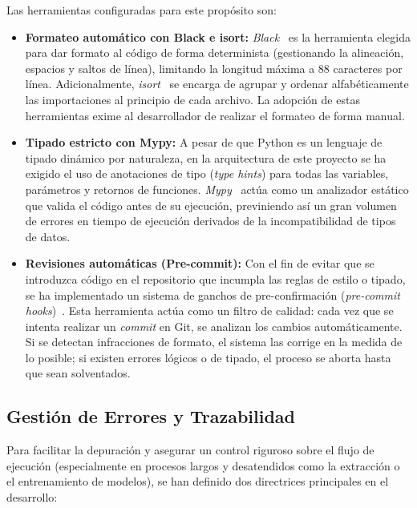 Las herramientas configuradas para este propósito son:
\begin{itemize}
    \item \textbf{Formateo automático con Black e isort:} \textit{Black}~\cite{BlackDocs} es la herramienta elegida para dar formato al código de forma determinista (gestionando la alineación, espacios y saltos de línea), limitando la longitud máxima a 88 caracteres por línea. Adicionalmente, \textit{isort}~\cite{IsortDocs} se encarga de agrupar y ordenar alfabéticamente las importaciones al principio de cada archivo. La adopción de estas herramientas exime al desarrollador de realizar el formateo de forma manual.
    \item \textbf{Tipado estricto con Mypy:} A pesar de que Python es un lenguaje de tipado dinámico por naturaleza, en la arquitectura de este proyecto se ha exigido el uso de anotaciones de tipo (\textit{type hints}) para todas las variables, parámetros y retornos de funciones. \textit{Mypy}~\cite{MypyDocs} actúa como un analizador estático que valida el código antes de su ejecución, previniendo así un gran volumen de errores en tiempo de ejecución derivados de la incompatibilidad de tipos de datos.
    \item \textbf{Revisiones automáticas (Pre-commit):} Con el fin de evitar que se introduzca código en el repositorio que incumpla las reglas de estilo o tipado, se ha implementado un sistema de ganchos de pre-confirmación (\textit{pre-commit hooks})~\cite{PreCommitDocs}. Esta herramienta actúa como un filtro de calidad: cada vez que se intenta realizar un \textit{commit} en Git, se analizan los cambios automáticamente. Si se detectan infracciones de formato, el sistema las corrige en la medida de lo posible; si existen errores lógicos o de tipado, el proceso se aborta hasta que sean solventados.
\end{itemize}

\subsection{Gestión de Errores y Trazabilidad}
Para facilitar la depuración y asegurar un control riguroso sobre el flujo de
ejecución (especialmente en procesos largos y desatendidos como la extracción o
el entrenamiento de modelos), se han definido dos directrices principales en el
desarrollo:

